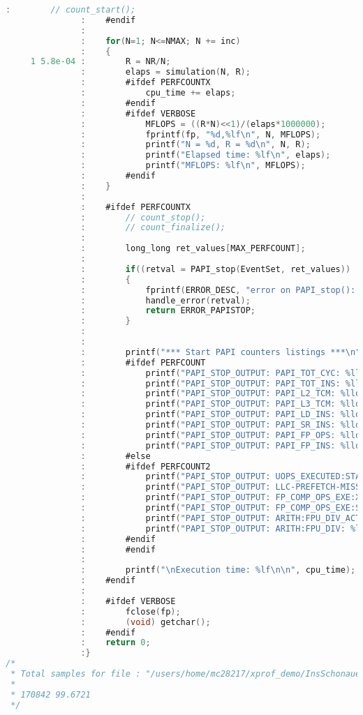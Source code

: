 \begin{lstlisting}[language=C,breaklines=true]
               :		// count_start();
               :	#endif
               :	
               :	for(N=1; N<=NMAX; N += inc)
               :	{
     1 5.8e-04 :		R = NR/N;
               :		elaps = simulation(N, R);
               :		#ifdef PERFCOUNTX
               :			cpu_time += elaps;
               :		#endif
               :		#ifdef VERBOSE		
               :			MFLOPS = ((R*N)<<1)/(elaps*1000000);
               :			fprintf(fp, "%d,%lf\n", N, MFLOPS);
               :			printf("N = %d, R = %d\n", N, R);
               :			printf("Elapsed time: %lf\n", elaps);
               :			printf("MFLOPS: %lf\n", MFLOPS);
               :		#endif
               :	}
               :
               :	#ifdef PERFCOUNTX
               :		// count_stop();
               :		// count_finalize();
               :	
               :		long_long ret_values[MAX_PERFCOUNT];
               :		
               :		if((retval = PAPI_stop(EventSet, ret_values)) != PAPI_OK)
               :		{
               :			fprintf(ERROR_DESC, "error on PAPI_stop(): ");
               :			handle_error(retval);	
               :			return ERROR_PAPISTOP;
               :		}
               :
               :
               :		printf("*** Start PAPI counters listings ***\n");
               :		#ifdef PERFCOUNT
               :			printf("PAPI_STOP_OUTPUT: PAPI_TOT_CYC: %lld\n", ret_values[PAPI_TOTCYC]);
               :			printf("PAPI_STOP_OUTPUT: PAPI_TOT_INS: %lld\n", ret_values[PAPI_TOTINS]);
               :			printf("PAPI_STOP_OUTPUT: PAPI_L2_TCM: %lld\n", ret_values[PAPI_L2TCM]);
               :			printf("PAPI_STOP_OUTPUT: PAPI_L3_TCM: %lld\n", ret_values[PAPI_L3TCM]);
               :			printf("PAPI_STOP_OUTPUT: PAPI_LD_INS: %lld\n", ret_values[PAPI_LDINS]);
               :			printf("PAPI_STOP_OUTPUT: PAPI_SR_INS: %lld\n", ret_values[PAPI_SRINS]);
               :			printf("PAPI_STOP_OUTPUT: PAPI_FP_OPS: %lld\n", ret_values[PAPI_FPOPS]);
               :			printf("PAPI_STOP_OUTPUT: PAPI_FP_INS: %lld\n", ret_values[PAPI_FPINS]);
               :		#else
               :		#ifdef PERFCOUNT2
               :			printf("PAPI_STOP_OUTPUT: UOPS_EXECUTED:STALL-CYCLES: %lld\n", ret_values[PAPI_UOPSEXECUTEDSTALLCYCLES]);
               :			printf("PAPI_STOP_OUTPUT: LLC-PREFETCH-MISSES: %lld\n", ret_values[PAPI_LLCPREFETCHMISSESPREFETCH]);
               :			printf("PAPI_STOP_OUTPUT: FP_COMP_OPS_EXE:X87: %lld\n", ret_values[PAPI_FPCOMPOPSEXEX87]);
               :			printf("PAPI_STOP_OUTPUT: FP_COMP_OPS_EXE:SSE_SCALAR_DOUBLE: %lld\n", ret_values[PAPI_FPCOMPOPSEXESSESCALARDOUBLE]);		
               :			printf("PAPI_STOP_OUTPUT: ARITH:FPU_DIV_ACTIVE: %lld\n", ret_values[PAPI_ARITHFPUDIVACTIVE]);
               :			printf("PAPI_STOP_OUTPUT: ARITH:FPU_DIV: %lld\n", ret_values[PAPI_ARITHFPUDIV]);
               :		#endif
               :		#endif
               :		
               :		printf("\nExecution time: %lf\n\n", cpu_time);
               :	#endif
               :	
               :	#ifdef VERBOSE
               :		fclose(fp);
               :		(void) getchar();
               :	#endif
               :	return 0;
               :}
/* 
 * Total samples for file : "/users/home/mc28217/xprof_demo/InsSchonauerTriadBenchmark.c"
 * 
 * 170842 99.6721
 */



\end{lstlisting}
